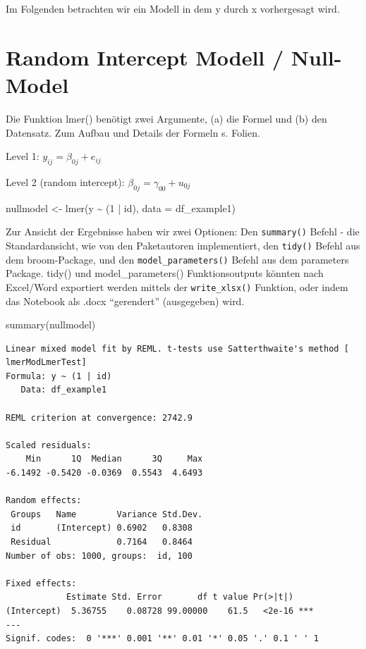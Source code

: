 \documentclass[
  letterpaper,
  DIV=11,
  numbers=noendperiod]{scrreprt}
\newenvironment{Shaded}{\begin{snugshade}}{\end{snugshade}}
\newcommand{\AttributeTok}[1]{\textcolor[rgb]{0.40,0.45,0.13}{#1}}
\newcommand{\DecValTok}[1]{\textcolor[rgb]{0.68,0.00,0.00}{#1}}
\newcommand{\FunctionTok}[1]{\textcolor[rgb]{0.28,0.35,0.67}{#1}}
\newcommand{\NormalTok}[1]{\textcolor[rgb]{0.00,0.23,0.31}{#1}}
\newcommand{\OtherTok}[1]{\textcolor[rgb]{0.00,0.23,0.31}{#1}}
\newcommand{\SpecialCharTok}[1]{\textcolor[rgb]{0.37,0.37,0.37}{#1}}
\begin{document}
Im Folgenden betrachten wir ein Modell in dem y durch x vorhergesagt
wird.

\section{Random Intercept Modell /
Null-Model}\label{random-intercept-modell-null-model}

Die Funktion lmer() benötigt zwei Argumente, (a) die Formel und (b) den
Datensatz. Zum Aufbau und Details der Formeln s. Folien.

Level 1: \(y_{ij} = \beta_{0j} + e_{ij}\)

Level 2 (random intercept): \(\beta_{0j} = \gamma_{00} + u_{0j}\)

\begin{Shaded}
\begin{Highlighting}[]
\NormalTok{nullmodel }\OtherTok{\textless{}{-}} \FunctionTok{lmer}\NormalTok{(y }\SpecialCharTok{\textasciitilde{}}\NormalTok{ (}\DecValTok{1} \SpecialCharTok{|}\NormalTok{ id), }\AttributeTok{data =}\NormalTok{ df\_example1)}
\end{Highlighting}
\end{Shaded}

Zur Ansicht der Ergebnisse haben wir zwei Optionen: Den
\texttt{summary()} Befehl - die Standardansicht, wie von den
Paketautoren implementiert, den \texttt{tidy()} Befehl aus dem
broom-Package, und den \texttt{model\_parameters()} Befehl aus dem
parameters Package. tidy() und model\_parameters() Funktionsoutputs
könnten nach Excel/Word exportiert werden mittels der
\texttt{write\_xlsx()} Funktion, oder indem das Notebook als .docx
``gerendert'' (ausgegeben) wird.

\begin{Shaded}
\begin{Highlighting}[]
\FunctionTok{summary}\NormalTok{(nullmodel)}
\end{Highlighting}
\end{Shaded}

\begin{verbatim}
Linear mixed model fit by REML. t-tests use Satterthwaite's method [
lmerModLmerTest]
Formula: y ~ (1 | id)
   Data: df_example1

REML criterion at convergence: 2742.9

Scaled residuals: 
    Min      1Q  Median      3Q     Max 
-6.1492 -0.5420 -0.0369  0.5543  4.6493 

Random effects:
 Groups   Name        Variance Std.Dev.
 id       (Intercept) 0.6902   0.8308  
 Residual             0.7164   0.8464  
Number of obs: 1000, groups:  id, 100

Fixed effects:
            Estimate Std. Error       df t value Pr(>|t|)    
(Intercept)  5.36755    0.08728 99.00000    61.5   <2e-16 ***
---
Signif. codes:  0 '***' 0.001 '**' 0.01 '*' 0.05 '.' 0.1 ' ' 1
\end{verbatim}
\end{document}
